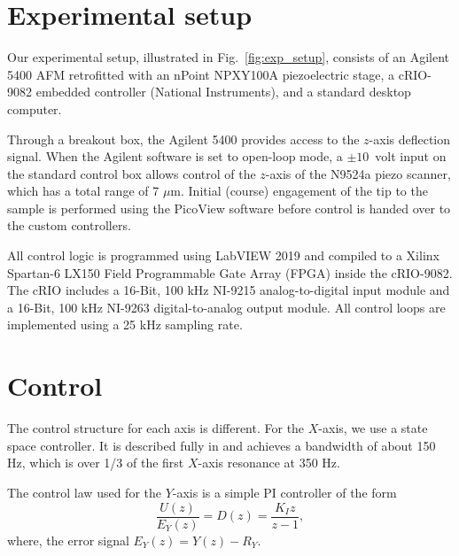 \documentclass[twocolumn,oneside]{IEEEtran/IEEEtran}
\begin{document}
\section{Experimental setup} \label{sec:experimentalSetup}
Our experimental setup, illustrated in Fig.~\ref{fig:exp_setup},
consists of an Agilent 5400 AFM  retrofitted with an nPoint NPXY100A
piezoelectric stage, a cRIO-9082 embedded controller (National
Instruments), and a standard desktop computer. 


Through a breakout box, the Agilent 5400 provides access to the $z$-axis deflection signal. When the Agilent software is set to open-loop mode, a $\pm10$~volt input on the standard control box allows control of the $z$-axis of the N9524a piezo scanner, which has a total range of 7 $\mu$m.
Initial (course) engagement of the tip to the
sample is performed using the PicoView software before control is handed over to
the custom controllers.
	
All control logic is programmed using LabVIEW 2019 and compiled to a Xilinx
Spartan-6 LX150 Field Programmable Gate Array (FPGA) inside the cRIO-9082. The
cRIO includes a 16-Bit, 100 kHz NI-9215 analog-to-digital input module and a
16-Bit, 100 kHz NI-9263 digital-to-analog output module. All control loops are
implemented using a 25 kHz sampling rate.

\section{Control}\label{sec:control}
The control structure for each axis is different. For the $X$-axis, we use a
state space controller. It is described fully in \cite{braker_afmmpc_2019} and
achieves a bandwidth of about 150 Hz, which is over 1/3 of the first $X$-axis
resonance at 350 Hz.


The control law used for the $Y$-axis is a simple PI controller of the
form
\begin{equation}
  \frac{U(z)}{E_Y(z)}=D(z) = \frac{K_Iz}{z-1},
  \label{eqn:dzI}
\end{equation}
where, the error signal $E_Y(z) = Y(z)-R_Y$.

\end{document}
